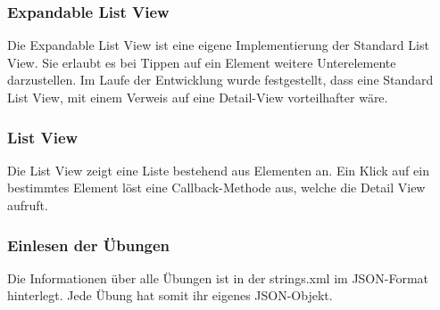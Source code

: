 \documentclass[FIPLY_base.tex]{subfiles}
\begin{document}
\subsubsection{Expandable List View}
Die Expandable List View ist eine eigene Implementierung der Standard List View. Sie erlaubt es bei Tippen auf ein Element weitere Unterelemente darzustellen.
Im Laufe der Entwicklung wurde festgestellt, dass eine Standard List View, mit einem Verweis auf eine Detail-View vorteilhafter wäre.

\subsubsection{List View}
Die List View zeigt eine Liste bestehend aus Elementen an. Ein Klick auf ein bestimmtes Element löst eine Callback-Methode aus, welche die Detail View aufruft.
\newpage
\subsubsection{Einlesen der Übungen}
Die Informationen über alle Übungen ist in der strings.xml im JSON-Format hinterlegt.
Jede Übung hat somit ihr eigenes JSON-Objekt. 
\end{document}
